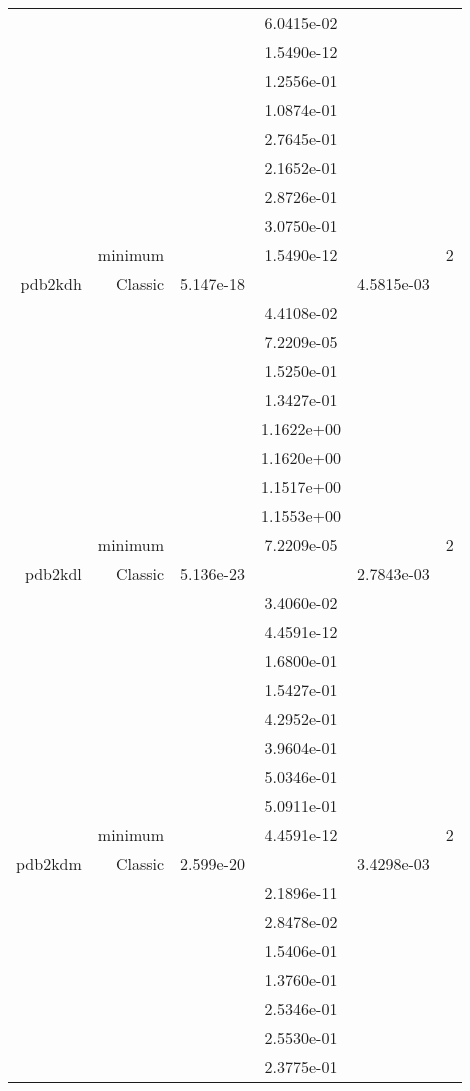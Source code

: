 \begin{xltabular}{\textwidth}{r|rS[table-format=1.3e+2]S[table-format=1.4e+2]S[table-format=1.4e+2]S[table-format=-1.5]}
&  &  & 6.0415e-02 & & \\
&  &  & 1.5490e-12 & & \\
&  &  & 1.2556e-01 & & \\
&  &  & 1.0874e-01 & & \\
&  &  & 2.7645e-01 & & \\
&  &  & 2.1652e-01 & & \\
&  &  & 2.8726e-01 & & \\
&  &  & 3.0750e-01 & & \\
& minimum &  & 1.5490e-12 & & 2 \\  \addlinespace
pdb2kdh & Classic & 5.147e-18 &  & 4.5815e-03 & \\
&  &  & 4.4108e-02 & & \\
&  &  & 7.2209e-05 & & \\
&  &  & 1.5250e-01 & & \\
&  &  & 1.3427e-01 & & \\
&  &  & 1.1622e+00 & & \\
&  &  & 1.1620e+00 & & \\
&  &  & 1.1517e+00 & & \\
&  &  & 1.1553e+00 & & \\
& minimum &  & 7.2209e-05 & & 2 \\  \addlinespace
pdb2kdl & Classic & 5.136e-23 &  & 2.7843e-03 & \\
&  &  & 3.4060e-02 & & \\
&  &  & 4.4591e-12 & & \\
&  &  & 1.6800e-01 & & \\
&  &  & 1.5427e-01 & & \\
&  &  & 4.2952e-01 & & \\
&  &  & 3.9604e-01 & & \\
&  &  & 5.0346e-01 & & \\
&  &  & 5.0911e-01 & & \\
& minimum &  & 4.4591e-12 & & 2 \\  \addlinespace
pdb2kdm & Classic & 2.599e-20 &  & 3.4298e-03 & \\
&  &  & 2.1896e-11 & & \\
&  &  & 2.8478e-02 & & \\
&  &  & 1.5406e-01 & & \\
&  &  & 1.3760e-01 & & \\
&  &  & 2.5346e-01 & & \\
&  &  & 2.5530e-01 & & \\
&  &  & 2.3775e-01 & & \\

\end{xltabular}
